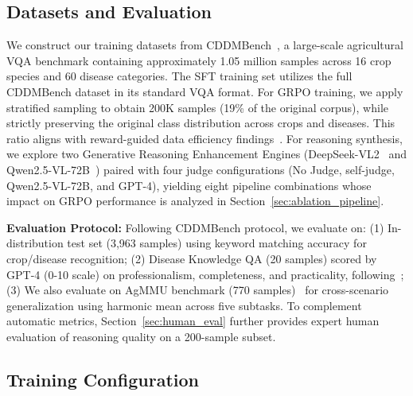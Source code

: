 \documentclass[sigconf,anonymous,review]{acmart}
\begin{document}
\subsection{Datasets and Evaluation}
\label{sec:datasets}
We construct our training datasets from CDDMBench~\cite{liu2024multimodal}, a large-scale agricultural VQA benchmark containing approximately 1.05 million samples across 16 crop species and 60 disease categories. The SFT training set utilizes the full CDDMBench dataset in its standard VQA format. For GRPO training, we apply stratified sampling to obtain 200K samples (19\% of the original corpus), while strictly preserving the original class distribution across crops and diseases. This ratio aligns with reward-guided data efficiency findings~\cite{zhi2025medgr}. For reasoning synthesis, we explore two Generative Reasoning Enhancement Engines (DeepSeek-VL2~\cite{wu2024deepseek} and Qwen2.5-VL-72B~\cite{bai2025qwen2}) paired with four judge configurations (No Judge, self-judge, Qwen2.5-VL-72B, and GPT-4), yielding eight pipeline combinations whose impact on GRPO performance is analyzed in Section~\ref{sec:ablation_pipeline}.

\textbf{Evaluation Protocol: }
Following CDDMBench protocol, we evaluate on: (1) In-distribution test set (3,963 samples) using keyword matching accuracy for crop/disease recognition; (2) Disease Knowledge QA (20 samples) scored by GPT-4 (0-10 scale) on professionalism, completeness, and practicality, following~\cite{liu2024multimodal}; (3) We also evaluate on AgMMU benchmark (770 samples)~\cite{gauba2025agmmu} for cross-scenario generalization using harmonic mean across five subtasks. To complement automatic metrics, Section~\ref{sec:human_eval} further provides expert human evaluation of reasoning quality on a 200-sample subset.


\subsection{Training Configuration}
\end{document}
